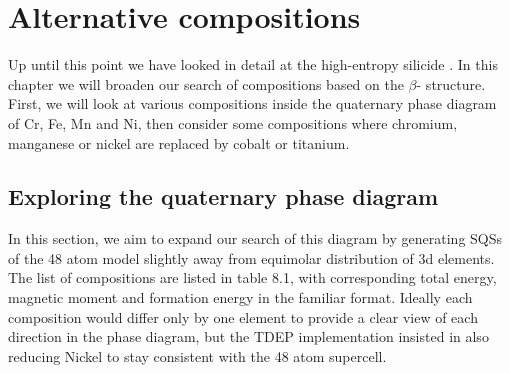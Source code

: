 \chapter{Alternative compositions}
\label{sec:comps}

Up until this point we have looked in detail at the high-entropy silicide . In this chapter we will broaden our search of compositions based on the $\beta$- structure. First, we will look at various compositions inside the quaternary phase diagram of Cr, Fe, Mn and Ni, then consider some compositions where chromium, manganese or nickel are replaced by cobalt or titanium. 

\section{Exploring the quaternary phase diagram}
In this section, we aim to expand our search of this diagram by generating SQSs of the 48 atom model slightly away from equimolar distribution of 3d elements. The list of compositions are listed in table 8.1, with corresponding total energy, magnetic moment and formation energy in the familiar format. Ideally each composition would differ only by one element to provide a clear view of each direction in the phase diagram, but the TDEP implementation insisted in also reducing Nickel to stay consistent with the 48 atom supercell. 

